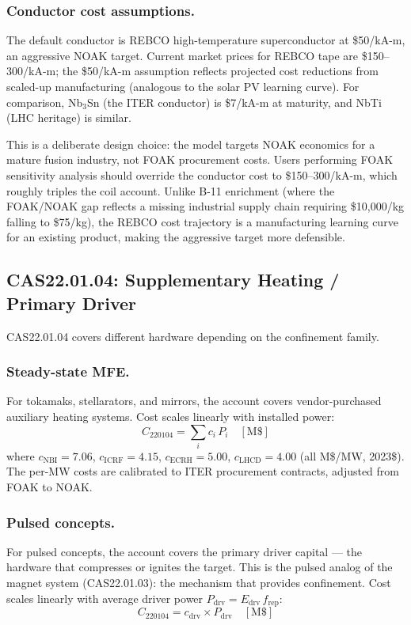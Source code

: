 \documentclass{article}
\begin{document}
\subsubsection{Conductor cost assumptions.}
The default conductor is REBCO high-temperature superconductor at
\$50/kA-m, an aggressive NOAK target.  Current market prices for
REBCO tape are \$150--300/kA-m; the \$50/kA-m assumption reflects
projected cost reductions from scaled-up manufacturing (analogous to
the solar PV learning curve).  For comparison, Nb$_3$Sn (the ITER
conductor) is \$7/kA-m at maturity, and NbTi (LHC heritage) is
similar.

This is a deliberate design choice: the model targets NOAK economics
for a mature fusion industry, not FOAK procurement costs.  Users
performing FOAK sensitivity analysis should override the conductor
cost to \$150--300/kA-m, which roughly triples the coil account.
Unlike B-11 enrichment (where the FOAK/NOAK gap reflects a missing
industrial supply chain requiring \$10{,}000/kg falling to \$75/kg), the
REBCO cost trajectory is a manufacturing learning curve for an
existing product, making the aggressive target more defensible.


\subsection{CAS22.01.04: Supplementary Heating / Primary Driver}
\label{sec:cas2204}

CAS22.01.04 covers different hardware depending on the confinement
family.

\subsubsection{Steady-state MFE.}
For tokamaks, stellarators, and mirrors, the account covers
vendor-purchased auxiliary heating systems.  Cost scales linearly with
installed power:
\begin{equation}
C_{220104} = \sum_i c_i \, P_i \quad [\text{M\$}]
\end{equation}
where $c_{\text{NBI}} = 7.06$, $c_{\text{ICRF}} = 4.15$,
$c_{\text{ECRH}} = 5.00$, $c_{\text{LHCD}} = 4.00$ (all M\$/MW,
2023\$).  The per-MW costs are calibrated to ITER procurement contracts,
adjusted from FOAK to NOAK.

\subsubsection{Pulsed concepts.}
For pulsed concepts, the account covers the primary driver capital ---
the hardware that compresses or ignites the target.  This is the pulsed
analog of the magnet system (CAS22.01.03): the mechanism that provides
confinement.  Cost scales linearly with average driver power
$P_{\text{drv}} = E_{\text{drv}} \, f_{\text{rep}}$:
\begin{equation}
C_{220104} = c_{\text{drv}} \times P_{\text{drv}} \quad [\text{M\$}]
\end{equation}
\end{document}
